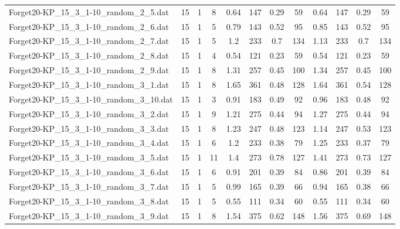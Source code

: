 \begin{sidewaystable}[!ht]
{\begin{tabular}{lccccccccccc}
Forget20-KP\_15\_3\_1-10\_random\_2\_5.dat & 15 & 1 & 8 & 0.64 & 147 &  \textcolor{blue2}{0.29} & 59 & 0.64 & 147 &  \textcolor{blue2}{0.29} & 59 \\
Forget20-KP\_15\_3\_1-10\_random\_2\_6.dat & 15 & 1 & 5 & 0.79 & 143 &  \textcolor{blue2}{0.52} & 95 & 0.85 & 143 &  \textcolor{blue2}{0.52} & 95 \\
Forget20-KP\_15\_3\_1-10\_random\_2\_7.dat & 15 & 1 & 5 & 1.2 & 233 &  \textcolor{blue2}{0.7} & 134 & 1.13 & 233 &  \textcolor{blue2}{0.7} & 134 \\
Forget20-KP\_15\_3\_1-10\_random\_2\_8.dat & 15 & 1 & 4 & 0.54 & 121 &  \textcolor{blue2}{0.23} & 59 & 0.54 & 121 &  \textcolor{blue2}{0.23} & 59 \\
Forget20-KP\_15\_3\_1-10\_random\_2\_9.dat & 15 & 1 & 8 & 1.31 & 257 &  \textcolor{blue2}{0.45} & 100 & 1.34 & 257 &  \textcolor{blue2}{0.45} & 100 \\
Forget20-KP\_15\_3\_1-10\_random\_3\_1.dat & 15 & 1 & 8 & 1.65 & 361 &  \textcolor{blue2}{0.48} & 128 & 1.64 & 361 & 0.54 & 128 \\
Forget20-KP\_15\_3\_1-10\_random\_3\_10.dat & 15 & 1 & 3 & 0.91 & 183 & 0.49 & 92 & 0.96 & 183 &  \textcolor{blue2}{0.48} & 92 \\
Forget20-KP\_15\_3\_1-10\_random\_3\_2.dat & 15 & 1 & 9 & 1.21 & 275 &  \textcolor{blue2}{0.44} & 94 & 1.27 & 275 &  \textcolor{blue2}{0.44} & 94 \\
Forget20-KP\_15\_3\_1-10\_random\_3\_3.dat & 15 & 1 & 8 & 1.23 & 247 &  \textcolor{blue2}{0.48} & 123 & 1.14 & 247 & 0.53 & 123 \\
Forget20-KP\_15\_3\_1-10\_random\_3\_4.dat & 15 & 1 & 6 & 1.2 & 233 & 0.38 & 79 & 1.25 & 233 &  \textcolor{blue2}{0.37} & 79 \\
Forget20-KP\_15\_3\_1-10\_random\_3\_5.dat & 15 & 1 & 11 & 1.4 & 273 & 0.78 & 127 & 1.41 & 273 & 0.73 & 127 \\
Forget20-KP\_15\_3\_1-10\_random\_3\_6.dat & 15 & 1 & 6 & 0.91 & 201 &  \textcolor{blue2}{0.39} & 84 & 0.86 & 201 &  \textcolor{blue2}{0.39} & 84 \\
Forget20-KP\_15\_3\_1-10\_random\_3\_7.dat & 15 & 1 & 5 & 0.99 & 165 & 0.39 & 66 & 0.94 & 165 &  \textcolor{blue2}{0.38} & 66 \\
Forget20-KP\_15\_3\_1-10\_random\_3\_8.dat & 15 & 1 & 5 & 0.55 & 111 &  \textcolor{blue2}{0.34} & 60 & 0.55 & 111 &  \textcolor{blue2}{0.34} & 60 \\
Forget20-KP\_15\_3\_1-10\_random\_3\_9.dat & 15 & 1 & 8 & 1.54 & 375 &  \textcolor{blue2}{0.62} & 148 & 1.56 & 375 & 0.69 & 148 \\

\end{tabular}}
\end{sidewaystable}
